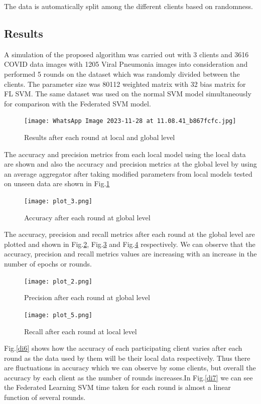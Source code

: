 \documentclass[conference]{IEEEtran}
\begin{document}
The data is automatically split among the different clients based on randomness.
\subsection{Results}
A simulation of the proposed algorithm was carried out with 3 clients and 3616 COVID data images with 1205 Viral Pneumonia images into consideration and performed 5 rounds on the dataset which was randomly divided between the clients. The parameter size was 80112 weighted matrix with 32 bias matrix for FL SVM. The same dataset was used on the normal SVM model simultaneously for comparison with the Federated SVM model. 
\begin{figure}[H]
    \centering
    \texttt{[image: WhatsApp Image 2023-11-28 at 11.08.41\_b867fcfc.jpg]}
    \caption{Results after each round at local and global level}
    \label{di2}
\end{figure}
The accuracy and precision metrics from each local model using the local data are shown and also the accuracy and precision metrics at the global level by using an average aggregator after taking modified parameters from local models tested on unseen data are shown in Fig.\ref{di2}
\begin{figure}[htp]
    \centering
    \texttt{[image: plot\_3.png]}
    \caption{Accuracy after each round at global level}
    \label{di3}
\end{figure}
The accuracy, precision and recall metrics after each round at the global level are plotted and shown in Fig.\ref{di3}, Fig.\ref{di4} and Fig.\ref{di5} respectively. We can observe that the accuracy, precision and recall metrics values are increasing with an increase in the number of epochs or rounds.

\begin{figure}[H]
    \centering
    \texttt{[image: plot\_2.png]}
    \caption{Precision after each round at global level}
    \label{di4}
\end{figure}

\begin{figure}[H]
    \centering
    \texttt{[image: plot\_5.png]}
    \caption{Recall after each round at local level}
    \label{di5}
\end{figure}

Fig.\ref{di6} shows how the accuracy of each participating client 
varies after each round as the data used by them will be their local data respectively. Thus there are fluctuations in accuracy which we can observe by some clients, but overall the accuracy by each client as the number of rounds increases.In Fig.\ref{di7} we can see the Federated Learning SVM time taken for each round is almost a linear function of several rounds.
\end{document}
